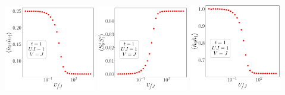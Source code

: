 \documentclass{report}
\numberwithin{equation}{section}
\begin{document}
\begin{center}
	\includegraphics[width=0.3\textwidth]{../figures/r-par-t=1.000,J=1_over_U,V=J,N=6,U=0.016,91.116,32.pdf}
	\includegraphics[width=0.3\textwidth]{../figures/r-ising-t=1.000,J=1_over_U,V=J,N=6,U=0.016,91.116,32.pdf}
	\includegraphics[width=0.3\textwidth]{../figures/r-charge-t=1.000,J=1_over_U,V=J,N=6,U=0.016,91.116,32.pdf}
\end{center}
\end{document}

